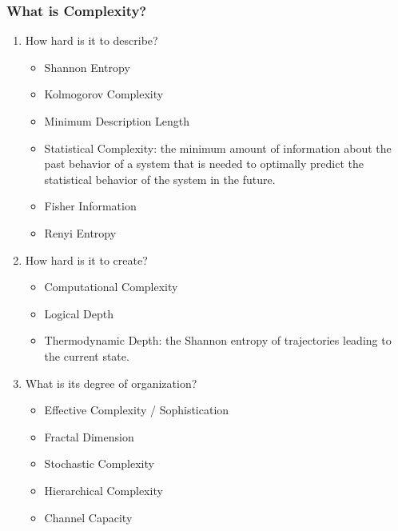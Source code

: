 \documentclass[UTF8,11pt,colorlinks,compress,openany]{beamer}%
\begin{document}
\begin{frame}\frametitle{What is Complexity?}
\begin{enumerate}
	\item How hard is it to describe?
	\begin{itemize}
		\item Shannon Entropy
		\item Kolmogorov Complexity
		\item Minimum Description Length
		\item Statistical Complexity: the minimum amount of information about the past behavior of a system that is needed to optimally predict the statistical behavior of the system in the future.
		\item Fisher Information
		\item Renyi Entropy
	\end{itemize}
	\item How hard is it to create?
	\begin{itemize}
		\item Computational Complexity
		\item Logical Depth
		\item Thermodynamic Depth: the Shannon entropy of trajectories leading to the current state.
	\end{itemize}
	\item What is its degree of organization?
	\begin{itemize}
		\item Effective Complexity / Sophistication
		\item Fractal Dimension
		\item Stochastic Complexity
		\item Hierarchical Complexity
		\item Channel Capacity
	\end{itemize}
\end{enumerate}
\end{frame}
\end{document}
